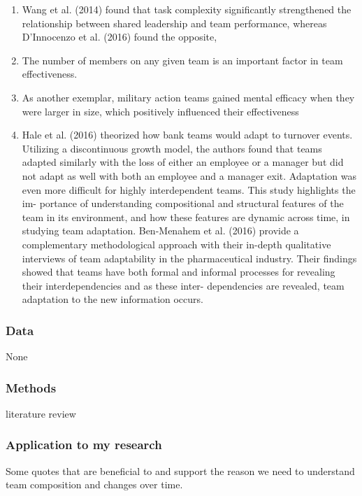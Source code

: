 \documentclass[12pt]{article}
\begin{document}
\begin{enumerate}
    \item Wang et al. (2014) found that task complexity significantly strengthened the relationship between shared leadership and team performance, whereas D’Innocenzo et al. (2016) found the opposite,
    \item The number of members on any given team is an important factor in team effectiveness.
    \item As another exemplar, military action teams gained mental efficacy when they were larger in size, which positively influenced their effectiveness
    \item Hale et al. (2016) theorized how bank teams would adapt to turnover events. Utilizing a discontinuous growth model, the authors found that teams adapted similarly with the loss of either an employee or a manager but did not adapt as well with both an employee and a manager exit. Adaptation was even more difficult for highly interdependent teams. This study highlights the im- portance of understanding compositional and structural features of the team in its environment, and how these features are dynamic across time, in studying team adaptation. Ben-Menahem et al. (2016) provide a complementary methodological approach with their in-depth qualitative interviews of team adaptability in the pharmaceutical industry. Their findings showed that teams have both formal and informal processes for revealing their interdependencies and as these inter- dependencies are revealed, team adaptation to the new information occurs.
\end{enumerate}

\subsubsection*{Data}

None

\subsubsection*{Methods}

literature review

\subsubsection*{Application to my research}

Some quotes that are beneficial to and support the reason we need to understand team composition and changes over time.
\end{document}
